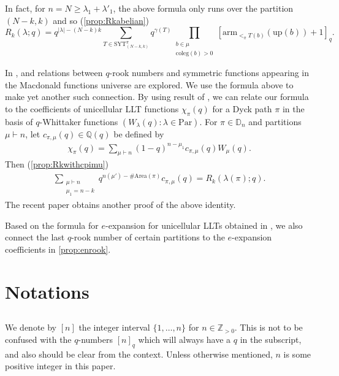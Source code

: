 \documentclass[12pt,reqno]{amsart}
\theoremstyle{plain}
\theoremstyle{definition}
\theoremstyle{remark}
\theoremstyle{example}
\numberwithin{equation}{section}
\newcommand\QQ{\mathbb{Q}}
\newcommand\ZZ{\mathbb{Z}}
\newcommand\Par{\mathrm{Par}}
\newcommand\up{\mathrm{up}}
\newcommand\arm{\mathrm{arm}}
\newcommand{\coleg}{\mathrm{coleg}}
\newcommand{\SYT}{\mathrm{SYT}}
\newcommand{\Area}{\mathrm{Area}}
\newcommand{\DD}{\mathbb{D}}
\begin{document}
In fact, for $n = N \geq \lambda_1 + \lambda'_1$, the above formula only runs over the partition $(N-k,k)$ and so (\autoref{prop:Rkabelian}) $$ R_k(\lambda;q) = q^{|\lambda|-(N-k)k} \sum_{T \in \SYT^\pi_{(N-k,k)}} q^{\gamma(T)} \prod_{\substack{b \in \mu \\ \coleg(b)>0}} [\arm_{<_\pi T(b)}(\up(b))+1]_q. $$

In \cite{Abreu_Nigro_csfmodular}, \cite{CMP_rook} and \cite{Ram_Schlosser_qWandrook}  relations between $q$-rook numbers and symmetric functions appearing in the Macdonald functions universe are explored. We use the formula above to make yet another such connection.
By using result of \cite{GMRWW_Macexpansion}, we can relate our formula to the coefficients of unicellular LLT functions $\chi_\pi(q)$ for a Dyck path $\pi$ in the basis of $q$-Whittaker functions $(W_\lambda(q):\lambda \in \Par)$. For $\pi \in \DD_n$ and partitions $\mu \vdash n$, let $c_{\pi,\mu}(q) \in \QQ(q)$ be defined by \begin{align*}
	\chi_\pi(q) = \sum_{\mu \vdash n} (1-q)^{n-\mu_1} c_{\pi,\mu}(q) W_\mu(q).
\end{align*} 
Then (\autoref{prop:Rkwithcpimu})
\begin{align*}
	\sum_{\substack{\mu \vdash n \\ \mu_1 = n-k}} q^{n(\mu')-\# \Area(\pi)} c_{\pi,\mu}(q) = R_k(\lambda(\pi);q).
\end{align*}
The recent paper \cite{kim2025halllittlewoodexpansionschromaticquasisymmetric} obtains another proof of the above identity.

Based on the formula for $e$-expansion for unicellular LLTs obtained in \cite{Abreu_Nigro_forests}, we also connect the last $q$-rook number of certain partitions to the $e$-expansion coefficients in \autoref{prop:enrook}.






\section{Notations}

\subsection{}We denote by $[n]$ the integer interval $\{1,\ldots,n\}$ for $n \in \ZZ_{>0}$. This is not to be confused with the $q$-numbers $[n]_q$ which will always have a $q$ in the subscript, and also should be clear from the context. Unless otherwise mentioned, $n$ is some positive integer in this paper.
\end{document}
